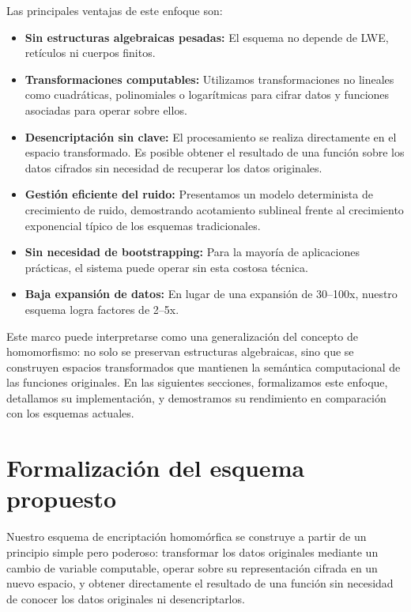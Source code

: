\documentclass[11pt]{article}
\theoremstyle{plain}
\begin{document}
Las principales ventajas de este enfoque son:

\begin{itemize}
    \item \textbf{Sin estructuras algebraicas pesadas:} El esquema no depende de LWE, retículos ni cuerpos finitos.
    
    \item \textbf{Transformaciones computables:} Utilizamos transformaciones no lineales como cuadráticas, polinomiales o logarítmicas para cifrar datos y funciones asociadas para operar sobre ellos.
    
    \item \textbf{Desencriptación sin clave:} El procesamiento se realiza directamente en el espacio transformado. Es posible obtener el resultado de una función sobre los datos cifrados sin necesidad de recuperar los datos originales.
    
    \item \textbf{Gestión eficiente del ruido:} Presentamos un modelo determinista de crecimiento de ruido, demostrando acotamiento sublineal frente al crecimiento exponencial típico de los esquemas tradicionales.
    
    \item \textbf{Sin necesidad de bootstrapping:} Para la mayoría de aplicaciones prácticas, el sistema puede operar sin esta costosa técnica.
    
    \item \textbf{Baja expansión de datos:} En lugar de una expansión de 30–100x, nuestro esquema logra factores de 2–5x.
\end{itemize}

Este marco puede interpretarse como una generalización del concepto de homomorfismo: no solo se preservan estructuras algebraicas, sino que se construyen espacios transformados que mantienen la semántica computacional de las funciones originales. En las siguientes secciones, formalizamos este enfoque, detallamos su implementación, y demostramos su rendimiento en comparación con los esquemas actuales.

\section{Formalización del esquema propuesto}

Nuestro esquema de encriptación homomórfica se construye a partir de un principio simple pero poderoso: transformar los datos originales mediante un cambio de variable computable, operar sobre su representación cifrada en un nuevo espacio, y obtener directamente el resultado de una función sin necesidad de conocer los datos originales ni desencriptarlos.
\end{document}
